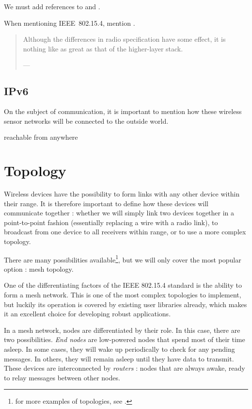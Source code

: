 
We must add references to \citep{shelby2010} and \citep{hunn2010}.

When mentioning IEEE~802.15.4, mention \citep{ieee802154}.

\begin{quotation}
Although the differences in radio specification have some effect, it is
nothing like as great as that of the higher-layer stack.

    --- 
     \citep[pg. 20]{hunn2010}
\end{quotation}


\subsection{IPv6}\label{sub:ipv6}

On the subject of communication, it is important to mention how these wireless
sensor networks will be connected to the outside world. 

reachable from anywhere


\section{Topology}\label{sec:topology}

Wireless devices have the possibility to form links with any other device within
their range. It is therefore important to define how these devices will
communicate together : whether we will simply link two devices together in
a point-to-point fashion (essentially replacing a wire with a radio link), to
broadcast from one device to all receivers within range, or to use a more
complex topology.

There are many possibilities available\footnote{for more examples of topologies,
see \citep[sec. 2.3.4]{hunn2010}.}, but we will only cover the most popular
option : mesh topology.

One of the differentiating factors of the IEEE 802.15.4 standard is the ability
to form a mesh network. This is one of the most complex topologies to implement,
but luckily its operation is covered by existing user libraries already, which
makes it an excellent choice for developing robust applications.

In a mesh network, nodes are differentiated by their role. In this case, there
are two possibilities. \emph{End nodes} are low-powered nodes that spend most of
their time asleep. In some cases, they will wake up periodically to check for
any pending messages. In others, they will remain asleep until they have data to
transmit. These devices are interconnected by \emph{routers} : nodes that are
always awake, ready to relay messages between other nodes.

